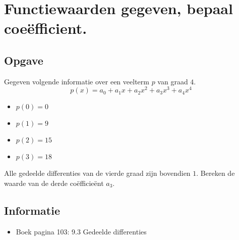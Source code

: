 \documentclass[examenvragen.tex]{subfiles}
\begin{document}
\section{Functiewaarden gegeven, bepaal coe\"efficient.}
\subsection{Opgave}
Gegeven volgende informatie over een veelterm $p$ van graad $4$.
\[
p(x) = a_{0} + a_1x + a_2x^{2} +a_{3}x^{3}+a_{4}x^{4}
\]
\begin{multicols}{4}
\begin{itemize}
\item $p(0)=0$
\item $p(1)=9$
\item $p(2)=15$
\item $p(3)=18$
\end{itemize}
\end{multicols}
Alle gedeelde differenties van de vierde graad zijn bovendien $1$.
Bereken de waarde van de derde co\"efficie\"ent $a_3$.
\subsection{Informatie}
\begin{itemize}
\item Boek pagina 103: 9.3 Gedeelde differenties
\end{itemize}
\end{document}
